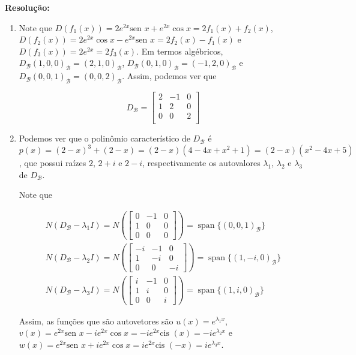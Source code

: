 \documentclass[leqno]{article}
\DeclareMathOperator{\spn}{span}
\newcommand{\cis}[1]{\text{cis }(#1)}
\begin{document}
\begin{enumerate}
    \textbf{Resolução:}
    
    \begin{enumerate}
        \item Note que $D(f_1(x))=2e^{2x}\text{sen }x+e^{2x}\cos{x}=2f_1(x)+f_2(x)$, $D(f_2(x))=2e^{2x}\cos{x}-e^{2x}\text{sen }x=2f_2(x)-f_1(x)$ e $D(f_3(x))=2e^{2x}=2f_3(x)$. Em termos algébricos, $D_{\mathcal{B}}(1,0,0)_{\mathcal{B}}=(2,1,0)_{\mathcal{B}}$, $D_{\mathcal{B}}(0,1,0)_{\mathcal{B}}=(-1,2,0)_{\mathcal{B}}$ e $D_{\mathcal{B}}(0,0,1)_{\mathcal{B}}=(0,0,2)_{\mathcal{B}}$. Assim, podemos ver que
        
        $$D_{\mathcal{B}}=\begin{bmatrix}
                2 & -1 & 0\\
                1 & 2 & 0\\
                0 & 0 & 2\\
        \end{bmatrix}$$
        
        \item Podemos ver que o polinômio característico de $D_{\mathcal{B}}$ é $p(x)=(2-x)^3+(2-x)=(2-x)(4-4x+x^2+1)=(2-x)(x^2-4x+5)$, que possui raízes $2$, $2+i$ e $2-i$, respectivamente os autovalores $\lambda_1$, $\lambda_2$ e $\lambda_3$ de $D_{\mathcal{B}}$.
        
        Note que
        
        \begin{align*}
            N(D_{\mathcal{B}}-\lambda_1I)=N\left(\begin{bmatrix}
                    0 & -1 & 0\\
                    1 & 0 & 0\\
                    0 & 0 & 0
            \end{bmatrix}\right)=\spn\{(0,0,1)_{\mathcal{B}}\}\\
            N(D_{\mathcal{B}}-\lambda_2I)=N\left(\begin{bmatrix}
                    -i & -1 & 0\\
                    1 & -i & 0\\
                    0 & 0 & -i
            \end{bmatrix}\right)=\spn\{(1,-i,0)_{\mathcal{B}}\}\\
            N(D_{\mathcal{B}}-\lambda_3I)=N\left(\begin{bmatrix}
                    i & -1 & 0\\
                    1 & i & 0\\
                    0 & 0 & i
            \end{bmatrix}\right)=\spn\{(1,i,0)_{\mathcal{B}}\}
        \end{align*}
        
        Assim, as funções que são autovetores são $u(x)=e^{\lambda_1x}$, $v(x)=e^{2x}\text{sen }x-ie^{2x}\cos{x}=-ie^{2x}\cis{x}=-ie^{\lambda_2x}$ e $w(x)=e^{2x}\text{sen }x+ie^{2x}\cos{x}=ie^{2x}\cis{-x}=ie^{\lambda_3x}$.
    \end{enumerate}
    
\end{enumerate}

 
\end{document}
